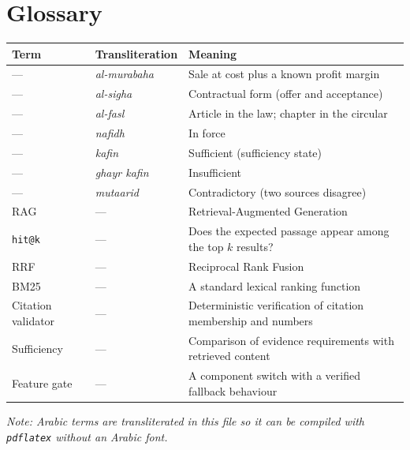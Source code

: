 \documentclass[a4paper,12pt,openany]{report}
\begin{document}
\chapter{Glossary}
\begin{table}[htbp]
\centering
\small
\begin{tabular}{p{3.0cm}p{3.0cm}p{8.5cm}}
\toprule
\textbf{Term} & \textbf{Transliteration} & \textbf{Meaning} \\
\midrule
— & \emph{al-murabaha} & Sale at cost plus a known profit margin \\
— & \emph{al-sigha} & Contractual form (offer and acceptance) \\
— & \emph{al-fasl} & Article in the law; chapter in the circular \\
— & \emph{nafidh} & In force \\
— & \emph{kafin} & Sufficient (sufficiency state) \\
— & \emph{ghayr kafin} & Insufficient \\
— & \emph{mutaarid} & Contradictory (two sources disagree) \\
RAG & — & Retrieval-Augmented Generation \\
\texttt{hit@k} & — & Does the expected passage appear among the top $k$ results? \\
RRF & — & Reciprocal Rank Fusion \\
BM25 & — & A standard lexical ranking function \\
Citation validator & — & Deterministic verification of citation membership and numbers \\
Sufficiency & — & Comparison of evidence requirements with retrieved content \\
Feature gate & — & A component switch with a verified fallback behaviour \\
\bottomrule
\end{tabular}
\end{table}

\emph{Note: Arabic terms are transliterated in this file so it can be compiled with
\texttt{pdflatex} without an Arabic font.}
\end{document}
